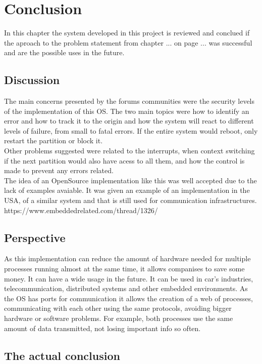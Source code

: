 \chapter{Conclusion}\label{ch:conclusion}

In this chapter the system developed in this project is reviewed and conclued if the aproach to the problem
 statement from chapter ... on page ... was successful and are the possible uses in the future.\\

\section{Discussion}
The main concerns presented by the forums communities were the security levels of the implementation of this 
OS. The two main topics were how to identify an error and how to track it to the origin and how the system
 will react to different levels of failure, from small to fatal errors. If the entire system would reboot,
  only restart the partition or block it.\\
 Other problems suggested were related to the interrupts, when context switching if the next partition would 
 also have acess to all them, and how the control is made to prevent any errors related.\\
The idea of an OpenSource implementation like this was well accepted due to the lack of examples avaiable. 
It was given an example of an implementation in the USA, of a similar system and that is still used for
communication infrastructures.
https://www.embeddedrelated.com/thread/1326/

\section{Perspective}

As this implementation can reduce the amount of hardware needed for multiple processes running almost at
 the same time, it allows companises to save some money. It can have a wide usage in the future. It can be
  used in car's industries, telecommunication, distributed systems and other embedded environments. 
 As the OS has ports for communication it allows the creation of a web of processes, communicating with 
 each other using the same protocols, avoiding bigger hardware or software problems. For example, both 
 processes use the same amount of data transmitted, not losing important info so often.
\\
\section{The actual conclusion}

